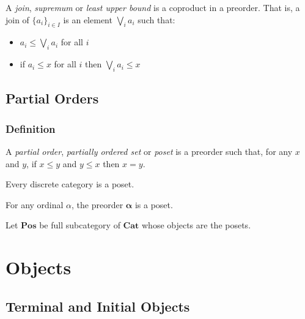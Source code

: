 \begin{df}
A \emph{join}, \emph{supremum} or \emph{least upper bound} is a coproduct in a preorder. That is, a join of $\{ a_i \}_{i \in I}$ is an element $\bigvee_i a_i$ such that:
\begin{itemize}
\item $a_i \leq \bigvee_i a_i$ for all $i$
\item if $a_i \leq x$ for all $i$ then $\bigvee_i a_i \leq x$
\end{itemize}
\end{df}

\section{Partial Orders}

\subsection{Definition}

\begin{df}
A \emph{partial order}, \emph{partially ordered set} or \emph{poset} is a preorder such that, for any $x$ and $y$, if $x \leq y$ and $y \leq x$ then $x = y$.
\end{df}

\begin{ex}
Every discrete category is a poset.
\end{ex}

\begin{ex}
For any ordinal $\alpha$, the preorder $\mathbf{\alpha}$ is a poset.
\end{ex}

\begin{df}
Let $\mathbf{Pos}$ be full subcategory of $\mathbf{Cat}$ whose objects are the posets.
\end{df}


\chapter{Objects}


\section{Terminal and Initial Objects}


